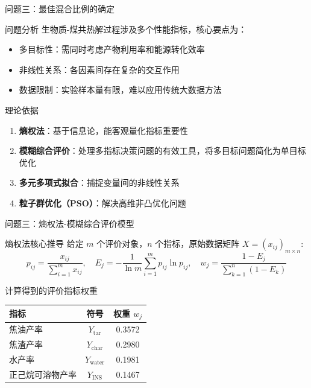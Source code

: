 \documentclass{beamer}
\begin{document}
\begin{frame}{问题三：最佳混合比例的确定}
    \begin{block}{问题分析}
        生物质-煤共热解过程涉及多个性能指标，核心要点为：
        \begin{itemize}
            \item 多目标性：需同时考虑产物利用率和能源转化效率
            \item 非线性关系：各因素间存在复杂的交互作用
            \item 数据限制：实验样本量有限，难以应用传统大数据方法
        \end{itemize}
    \end{block}
    \begin{block}{理论依据}
        \begin{enumerate}
            \item \textbf{熵权法}：基于信息论，能客观量化指标重要性
            \item \textbf{模糊综合评价}：处理多指标决策问题的有效工具，将多目标问题简化为单目标优化
            \item \textbf{多元多项式拟合}：捕捉变量间的非线性关系
            \item \textbf{粒子群优化（PSO）}：解决高维非凸优化问题
        \end{enumerate}
    \end{block}
\end{frame}

\begin{frame}{问题三：熵权法-模糊综合评价模型}
    \scriptsize
    \begin{block}{熵权法核心推导}
        给定 $m$ 个评价对象，$n$ 个指标，原始数据矩阵 $X = (x_{ij})_{m \times n}$:
        \[
            p_{ij} = \frac{x_{ij}}{\sum_{i=1}^m x_{ij}}, \quad
            E_j = -\frac{1}{\ln m}\sum_{i=1}^m p_{ij}\ln p_{ij}, \quad
            w_j = \frac{1-E_j}{\sum_{k=1}^n (1-E_k)}
        \]
    \end{block}
    \begin{block}{计算得到的评价指标权重}
        \centering
        \begin{tabular}{lcc}
            \toprule
            \textbf{指标} & \textbf{符号} & \textbf{权重 $w_j$} \\
            \midrule
            焦油产率 & $Y_\text{tar}$ & 0.3572 \\
            焦渣产率 & $Y_\text{char}$ & 0.2980 \\
            水产率 & $Y_\text{water}$ & 0.1981 \\
            正己烷可溶物产率 & $Y_\text{INS}$ & 0.1467 \\
            \bottomrule
        \end{tabular}
    \end{block}
\end{frame}
\end{document}

